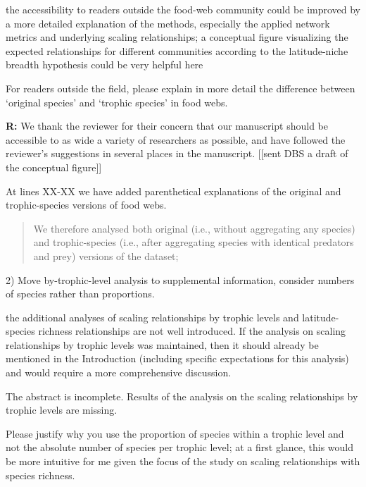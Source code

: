 \documentclass[12pt]{letter}
\newenvironment{refquote}{\bigskip \begin{it}}{\end{it}\smallskip}
\begin{document}
  \begin{refquote}

    the accessibility to readers outside the food-web community could be
    improved by a more detailed explanation of the methods, especially the
    applied network metrics and underlying scaling relationships; a conceptual
    figure visualizing the expected relationships for different communities
    according to the latitude-niche breadth hypothesis could be very helpful
    here

    \smallskip

     For readers outside the field, please explain in more detail the
     difference between `original species' and `trophic species' in food webs.

  \end{refquote}


  \textbf{R:} We thank the reviewer for their concern that our manuscript
  should be accessible to as wide a variety of    researchers as possible, and
  have followed the reviewer's suggestions in several places in the manuscript.
  [[sent DBS a draft of the conceptual figure]]
  

  At lines XX-XX we have added parenthetical explanations of the original and 
  trophic-species versions of food webs.

  \begin{quotation}

    We therefore analysed both original (i.e., without aggregating any species) and
    trophic-species (i.e., after aggregating species with identical predators and
    prey) versions of the dataset;

  \end{quotation}


  2) Move by-trophic-level analysis to supplemental information, consider
  numbers of species rather than proportions.

  \begin{refquote}

    the additional analyses of scaling relationships by trophic levels and
    latitude-species richness relationships are not well introduced. If the
    analysis on scaling relationships by trophic levels was maintained, then
    it should already be mentioned in the Introduction (including specific
    expectations for this analysis) and would require a more comprehensive
    discussion.

    \smallskip

    The abstract is incomplete. Results of the analysis on the scaling
    relationships by trophic levels are missing.

    \smallskip

    Please justify why you use the proportion of species within a trophic
    level and not the absolute number of species per trophic level; at a first
    glance, this would be more intuitive for me given the focus of the study
    on scaling relationships with species richness.

  \end{refquote}
\end{document}
